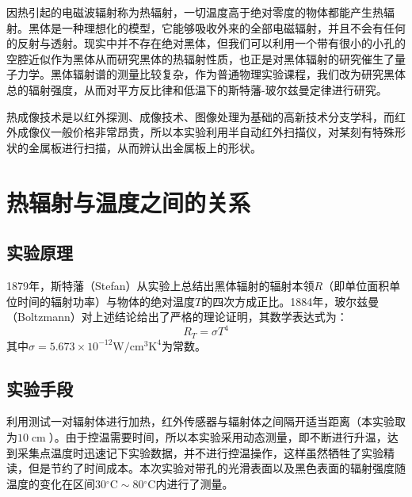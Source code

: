 \documentclass{WHUReport}
\begin{document}
\begin{multicols}{2}
	因热引起的电磁波辐射称为热辐射，一切温度高于绝对零度的物体都能产生热辐射。黑体是一种理想化的模型，它能够吸收外来的全部电磁辐射，并且不会有任何的反射与透射。现实中并不存在绝对黑体，但我们可以利用一个带有很小的小孔的空腔近似作为黑体从而研究黑体的热辐射性质，也正是对黑体辐射的研究催生了量子力学。黑体辐射谱的测量比较复杂，作为普通物理实验课程，我们改为研究黑体总的辐射强度，从而对平方反比律和低温下的斯特藩-玻尔兹曼定律进行研究。
	
	热成像技术是以红外探测、成像技术、图像处理为基础的高新技术分支学科，而红外成像仪一般价格非常昂贵，所以本实验利用半自动红外扫描仪，对某刻有特殊形状的金属板进行扫描，从而辨认出金属板上的形状。
	
	\section{热辐射与温度之间的关系}
	\subsection{实验原理}
	1879年，斯特藩（Stefan）从实验上总结出黑体辐射的辐射本领$R$（即单位面积单位时间的辐射功率）与物体的绝对温度$T$的四次方成正比。1884年，玻尔兹曼（Boltzmann）对上述结论给出了严格的理论证明，其数学表达式为：
	\begin{equation}
		R_T=\sigma T^4
	\end{equation}
	其中$\sigma=5.673\times 10^{-12}\operatorname{W/cm^3K^4}$为常数。
	\subsection{实验手段}
	利用测试一对辐射体进行加热，红外传感器与辐射体之间隔开适当距离（本实验取为$10\operatorname{cm}$）。由于控温需要时间，所以本实验采用动态测量，即不断进行升温，达到采集点温度时迅速记下实验数据，并不进行控温操作，这样虽然牺牲了实验精读，但是节约了时间成本。本次实验对带孔的光滑表面以及黑色表面的辐射强度随温度的变化在区间$30\operatorname{^\circ C}\sim 80\operatorname{^\circ C}$内进行了测量。

\end{multicols}
\end{document}

